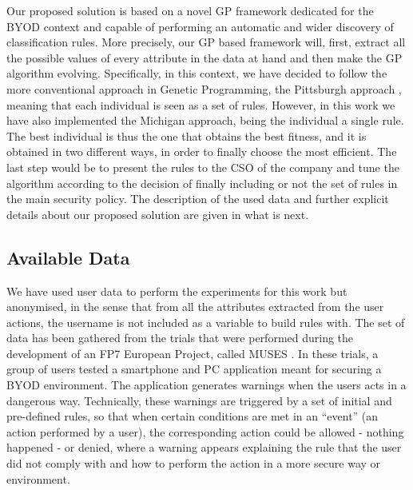 \documentclass[a4paper,10pt,twocolumn,preprint,3p]{elsarticle}
\begin{document}
Our proposed solution is based on a novel GP framework dedicated for
the BYOD context and capable of performing an automatic and wider discovery of classification rules. More precisely, our GP based framework will, first, extract all the possible values of every attribute in the data at hand and then make the GP algorithm evolving. 
Specifically, in this context, we have decided to follow the more
conventional approach in Genetic Programming, the Pittsburgh approach
\cite{freitas2002data}, meaning that each individual is seen as a set
of rules. However, in this work we have also implemented the Michigan approach, being the individual a single rule. The best individual is thus the one that obtains the best fitness, and it is obtained in two different ways, in order to finally choose the most efficient. The last step would be to present the rules to the CSO of the company and tune the algorithm according to the decision of
finally including or not the set of rules in the main security
policy. The description of the used data and further explicit details
about our proposed solution are given in what is next. %

\subsection{Available Data}
\label{subsec:data}

We have used user data to perform the experiments for this
work but anonymised, in the sense that from all the attributes extracted from the user actions, the username is not included as a variable to build rules with. %
 The set of data has been gathered from the trials that were performed
 during the development of an FP7 European Project, called MUSES
 \cite{DBLP:conf/sac/MoraCGZJEBAH14}. In these trials, a group of
 users tested a smartphone and PC application meant for securing a
 BYOD environment. The application generates warnings when the users
 acts in a dangerous way. Technically, these warnings are triggered by
 a set of initial and pre-defined rules, so that when certain
 conditions are met in an ``event'' (an action performed by a user),
 the corresponding action could be allowed - nothing happened - or
 denied, where a warning appears explaining the rule that the user did not comply with and how to perform the action in a more secure way or environment.
\end{document}
